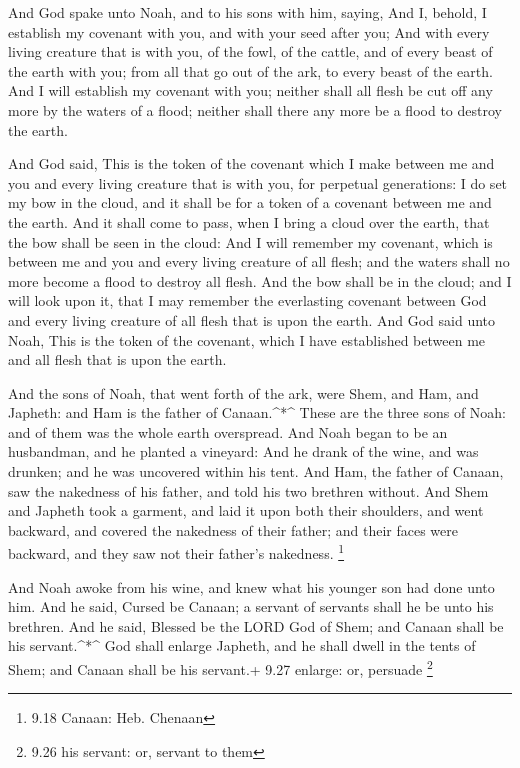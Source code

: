  And God spake unto Noah, and to his sons with him, saying,
 And I, behold, I establish my covenant with you, and with
your seed after you;  And with every living creature that
is with you, of the fowl, of the cattle, and of every beast of the earth
with you; from all that go out of the ark, to every beast of the earth.
 And I will establish my covenant with you; neither shall
all flesh be cut off any more by the waters of a flood; neither shall
there any more be a flood to destroy the earth.

 And God said, This is the token of the covenant which I
make between me and you and every living creature that is with you, for
perpetual generations:  I do set my bow in the cloud, and
it shall be for a token of a covenant between me and the earth.
 And it shall come to pass, when I bring a cloud over the
earth, that the bow shall be seen in the cloud:  And I will
remember my covenant, which is between me and you and every living
creature of all flesh; and the waters shall no more become a flood to
destroy all flesh.  And the bow shall be in the cloud; and
I will look upon it, that I may remember the everlasting covenant
between God and every living creature of all flesh that is upon the
earth.  And God said unto Noah, This is the token of the
covenant, which I have established between me and all flesh that is upon
the earth.

 And the sons of Noah, that went forth of the ark, were
Shem, and Ham, and Japheth: and Ham is the father of Canaan.\^{}*\^{}
 These are the three sons of Noah: and of them was the
whole earth overspread.  And Noah began to be an
husbandman, and he planted a vineyard:  And he drank of the
wine, and was drunken; and he was uncovered within his tent.
 And Ham, the father of Canaan, saw the nakedness of his
father, and told his two brethren without.  And Shem and
Japheth took a garment, and laid it upon both their shoulders, and went
backward, and covered the nakedness of their father; and their faces
were backward, and they saw not their father's nakedness. \footnote{9.18
  Canaan: Heb. Chenaan}

 And Noah awoke from his wine, and knew what his younger
son had done unto him.  And he said, Cursed be Canaan; a
servant of servants shall he be unto his brethren.  And he
said, Blessed be the LORD God of Shem; and Canaan shall be his
servant.\^{}*\^{}  God shall enlarge Japheth, and he shall
dwell in the tents of Shem; and Canaan shall be his servant.+ 9.27
enlarge: or, persuade \footnote{9.26 his servant: or, servant to them}

